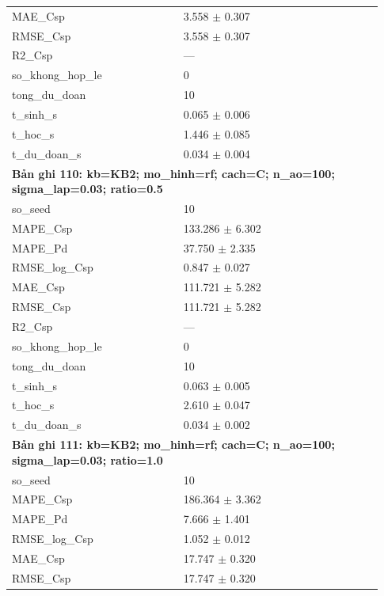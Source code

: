 \begin{longtable}{p{0.43\linewidth}p{0.50\linewidth}}
MAE\_\allowbreak Csp & 3.558 $\pm$ 0.307 \\
RMSE\_\allowbreak Csp & 3.558 $\pm$ 0.307 \\
R2\_\allowbreak Csp & — \\
so\_\allowbreak khong\_\allowbreak hop\_\allowbreak le & 0 \\
tong\_\allowbreak du\_\allowbreak doan & 10 \\
t\_\allowbreak sinh\_\allowbreak s & 0.065 $\pm$ 0.006 \\
t\_\allowbreak hoc\_\allowbreak s & 1.446 $\pm$ 0.085 \\
t\_\allowbreak du\_\allowbreak doan\_\allowbreak s & 0.034 $\pm$ 0.004 \\
\midrule
\multicolumn{2}{p{0.95\linewidth}}{\textbf{Bản ghi 110: kb=KB2; mo\_hinh=rf; cach=C; n\_ao=100; sigma\_lap=0.03; ratio=0.5}} \\
so\_\allowbreak seed & 10 \\
MAPE\_\allowbreak Csp & 133.286 $\pm$ 6.302 \\
MAPE\_\allowbreak Pd & 37.750 $\pm$ 2.335 \\
RMSE\_\allowbreak log\_\allowbreak Csp & 0.847 $\pm$ 0.027 \\
MAE\_\allowbreak Csp & 111.721 $\pm$ 5.282 \\
RMSE\_\allowbreak Csp & 111.721 $\pm$ 5.282 \\
R2\_\allowbreak Csp & — \\
so\_\allowbreak khong\_\allowbreak hop\_\allowbreak le & 0 \\
tong\_\allowbreak du\_\allowbreak doan & 10 \\
t\_\allowbreak sinh\_\allowbreak s & 0.063 $\pm$ 0.005 \\
t\_\allowbreak hoc\_\allowbreak s & 2.610 $\pm$ 0.047 \\
t\_\allowbreak du\_\allowbreak doan\_\allowbreak s & 0.034 $\pm$ 0.002 \\
\midrule
\multicolumn{2}{p{0.95\linewidth}}{\textbf{Bản ghi 111: kb=KB2; mo\_hinh=rf; cach=C; n\_ao=100; sigma\_lap=0.03; ratio=1.0}} \\
so\_\allowbreak seed & 10 \\
MAPE\_\allowbreak Csp & 186.364 $\pm$ 3.362 \\
MAPE\_\allowbreak Pd & 7.666 $\pm$ 1.401 \\
RMSE\_\allowbreak log\_\allowbreak Csp & 1.052 $\pm$ 0.012 \\
MAE\_\allowbreak Csp & 17.747 $\pm$ 0.320 \\
RMSE\_\allowbreak Csp & 17.747 $\pm$ 0.320 \\

\end{longtable}
